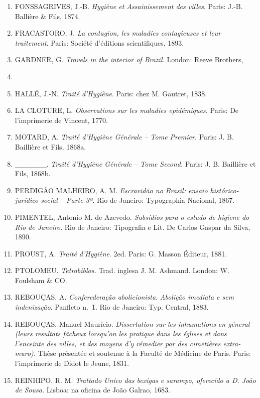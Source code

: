 \begin{enumerate}
{  land of the cocoa and the palm.} New York: Harper \& Brothers
  publishers, 1856.
\item
  FONSSAGRIVES, J.-B. \emph{Hygiène et Assainissement des villes}.
  Paris: J.-B. Ballière \& Fils, 1874.
\item
  FRACASTORO, J. \emph{La contagion, les maladies contagieuses et leur
  traitement}. Paris: Société d'éditions scientifiques, 1893.
\item
  GARDNER, G. \emph{Travels in the interior of Brazil.} London: Reeve
  Brothers,
\item
\item
  HALLÉ, J.-N. \emph{Traité d'Hygiène}. Paris: chez M. Gautret, 1838.
\item
  LA CLOTURE, L. \emph{Observations sur les maladies epidémiques.}
  Paris: De l'imprimerie de Vincent, 1770.
\item
  MOTARD, A. \emph{Traité d'Hygiène Générale -- Tome Premier.} Paris: J.
  B. Baillière et Fils, 1868a.
\item
  \_\_\_\_\_\_. \emph{Traité d'Hygiène Générale -- Tome Second.} Paris:
  J. B. Baillière et Fils, 1868b.
\item
  PERDIGÃO MALHEIRO, A. M. \emph{Escravidão no Brasil: ensaio
  histórico-jurídico-social -- Parte 3ª}. Rio de Janeiro: Typographia
  Nacional, 1867.
\item
  PIMENTEL, Antonio M. de Azevedo. \emph{Subsídios para o estudo de
  higiene do Rio de Janeiro}. Rio de Janeiro: Tipografia e Lit. De
  Carlos Gaspar da Silva, 1890.
\item
  PROUST, A. \emph{Traité d'Hygiène}. 2ed. Paris: G. Masson Éditeur,
  1881.
\item
  PTOLOMEU. \emph{Tetrabiblos.} Trad. inglesa J. M. Ashmand. London: W.
  Foulsham \& CO.
\item
  REBOUÇAS, A. \emph{Conferederação abolicionista}. \emph{Abolição
  imediata e sem indenização}. Panfleto n.~1. Rio de Janeiro: Typ.
  Central, 1883.
\item
  REBOUÇAS, Manuel Maurício. \emph{Dissertation sur les inhumations en
  géneral (leurs resultats fâcheux lorsqu'on les pratique dans les
  églises et dans l'enceinte des villes, et des moyens d'y rémedier par
  des cimetières extra-muro).} Thèse présentée et soutenue à la Faculté
  de Médicine de Paris. Paris: l'imprimerie de Didot le Jeune, 1831.
\item
  REINHIPO, R. M. \emph{Trattado Unico das bexigas e sarampo, oferecido
  a D. João de Sousa.} Lisboa: na oficina de João Galrao, 1683.

\end{enumerate}
